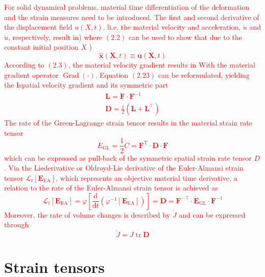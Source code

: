\textcolor{red}{
For solid dynamical problems, material time differentiation of the deformation and the strain measures need to be introduced. The first and second derivative of the displacement field \(u(X, t)\). li.e. the material velocity and acceleration, \(\dot{u}\) and \(\ddot{u}\), respectively, result in)
where \((2.2)\) can be used to show that due to the constant initial position \(X\) )
\[
\hat{\boldsymbol{x}}(\boldsymbol{X}, t) \equiv \overline{\boldsymbol{u}}(\boldsymbol{X}, t)
\]
According to \((2.3)\), the material velocity gradient results in
With the material gradient operator \(\operatorname{Grad}(\cdot)\). Equation \((2.23)\) can be reformulated, yielding the Ispatial velocity gradient
and its symmetric part
\[
\begin{array}{c}
\boldsymbol{L}=\dot{\boldsymbol{F}} \cdot \boldsymbol{F}^{-1} \\
\boldsymbol{D}=\frac{1}{2}\left(\boldsymbol{L}+\boldsymbol{L}^{\top}\right)
\end{array}
\]
The rate of the Green-Lagrange strain tensor results in the material strain rate tensor
\[
\dot{E}_{\mathrm{GL}}=\frac{1}{2} \dot{C}=\boldsymbol{F}^{\mathrm{T}} \cdot \boldsymbol{D} \cdot \boldsymbol{F}
\]
which can be expressed as pull-back of the symmetric spatial strain rate tensor \(D\). Via the Liederivative or Oldroyd-Lie derivative of the Euler-Almansi strain tensor \(\mathcal{L}_{t}\left[\boldsymbol{E}_{\mathrm{EA}}\right]\), which represents an objective material time derivative, a relation to the rate of the Euler-Almansi strain tensor is achieved as
\[
\mathcal{L}_{t}\left[\boldsymbol{E}_{\mathrm{EA}}\right]=\varphi\left[\frac{\mathrm{d}}{\mathrm{d} t}\left(\varphi^{-1}\left[\boldsymbol{E}_{\mathrm{EA}}\right]\right)\right]=\boldsymbol{D}=\boldsymbol{F}^{-\top} \cdot \dot{\boldsymbol{E}}_{\mathrm{GL}} \cdot \boldsymbol{F}^{-1}
\]
Moreover, the rate of volume changes is described by \(\dot{J}\) and can be expressed through
\[
\dot{J}=J \operatorname{tr} \boldsymbol{D}
\]}


\section{Strain tensors}

